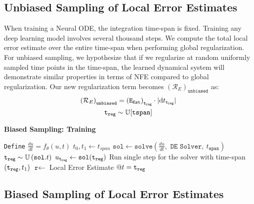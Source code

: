 \subsection{Unbiased Sampling of Local Error Estimates}
\label{subsec:unbiased_sampling_of_local_error_estimates}

When training a Neural ODE, the integration time-span is fixed. Training any deep learning model involves several thousand steps. We compute the total local error estimate over the entire time-span when performing global regularization. For unbiased sampling, we hypothesize that if we regularize at random uniformly sampled time points in the time-span, the learned dynamical system will demonstrate similar properties in terms of NFE compared to global regularization. Our new regularization term becomes $\left(\mathcal{R}_{E}\right)_{\texttt{unbiased}}$ as:
%
\begin{gather}
  \left(\mathcal{R}_{E}\right)_{\texttt{unbiased}} = \left(\texttt{E}_{\texttt{Est}}\right)_{\texttt{t}_{\texttt{reg}}} \cdot |\mathrm{d}t_{\texttt{t}_{\texttt{reg}}}|\\
  \texttt{t}_{\texttt{reg}} \sim \mathbb{U}[\texttt{tspan}]
\end{gather}
%

\begin{algorithm}[t]
  \caption{\textbf{Biased Sampling: Training}}
  \label{alg:local_regularization_biased_sampling}
  \begin{algorithmic}[1]
    \State \texttt{Define} $\frac{du}{dt} = f_\theta(u, t)$
    \State $t_0, t_1 \gets t_{span}$
    \State $\texttt{sol} \gets \texttt{solve}(\frac{du}{dt}, \texttt{ DE Solver},~t_{\texttt{span}})$
    \State $\texttt{t}_{\texttt{reg}} \sim \mathbb{U}\left(\texttt{sol}.t\right)$
    \State $u_{\texttt{t}_{\texttt{reg}}} \gets \texttt{sol}(\texttt{t}_{\texttt{reg}})$
    \State Run single step for the solver with time-span $(\texttt{t}_{\texttt{reg}}, t_1)$
    \State $\texttt{r} \gets $ Local Error Estimate $@ t=\texttt{t}_{\texttt{reg}}$
    \State {}
    \EndFunction
  \end{algorithmic}
\end{algorithm}

\subsection{Biased Sampling of Local Error Estimates}
\label{subsec:biased_sampling_of_local_error_estimates}

